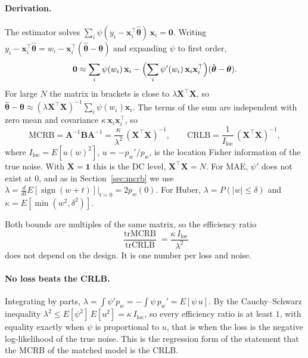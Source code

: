 \documentclass[11pt]{article}
\numberwithin{figure}{section}
\numberwithin{equation}{section}
\begin{document}
\paragraph{Derivation.} The estimator solves $\sum_i \psi(y_i - \mathbf{x}_i^\top\hat{\boldsymbol\theta})\,\mathbf{x}_i = \mathbf 0$.
Writing $y_i - \mathbf{x}_i^\top\hat{\boldsymbol\theta} = w_i - \mathbf{x}_i^\top(\hat{\boldsymbol\theta} - \boldsymbol\theta)$ and expanding
$\psi$ to first order,
\[
  \mathbf 0 \approx \sum_i \psi(w_i)\,\mathbf{x}_i - \Bigl(\sum_i \psi'(w_i)\,\mathbf{x}_i\mathbf{x}_i^\top\Bigr)(\hat{\boldsymbol\theta} - \boldsymbol\theta).
\]
For large $N$ the matrix in brackets is close to $\lambda\mathbf{X}^\top\mathbf{X}$, so
$\hat{\boldsymbol\theta} - \boldsymbol\theta \approx (\lambda\mathbf{X}^\top\mathbf{X})^{-1}\sum_i\psi(w_i)\mathbf{x}_i$. The terms of the sum are
independent with zero mean and covariance $\kappa\,\mathbf{x}_i\mathbf{x}_i^\top$, so
\begin{equation}
  \text{MCRB} = \mathbf{A}^{-1}\mathbf{B}\mathbf{A}^{-1} = \frac{\kappa}{\lambda^2}\,(\mathbf{X}^\top\mathbf{X})^{-1},
  \qquad
  \text{CRLB} = \frac{1}{I_{\text{loc}}}\,(\mathbf{X}^\top\mathbf{X})^{-1},
  \label{eq:mcrb-reg}
\end{equation}
where $I_{\text{loc}} = E[u(w)^2]$, $u = -p_w'/p_w$, is the location Fisher information of the true noise. With
$\mathbf{X} = \mathbf 1$ this is the DC level, $\mathbf{X}^\top\mathbf{X} = N$. For MAE, $\psi'$ does not exist at $0$, and as in
Section~\ref{sec:mcrb} we use $\lambda = \frac{d}{dt}E[\operatorname{sign}(w + t)]|_{t=0} = 2p_w(0)$. For Huber,
$\lambda = P(|w| \leq \delta)$ and $\kappa = E[\min(w^2, \delta^2)]$.

Both bounds are multiples of the same matrix, so the efficiency ratio
\[
  \frac{\operatorname{tr}\text{MCRB}}{\operatorname{tr}\text{CRLB}} = \frac{\kappa\,I_{\text{loc}}}{\lambda^2}
\]
does not depend on the design. It is one number per loss and noise.

\paragraph{No loss beats the CRLB.} Integrating by parts, $\lambda = \int\psi' p_w = -\int \psi\,p_w' = E[\psi\,u]$.
By the Cauchy--Schwarz inequality $\lambda^2 \leq E[\psi^2]\,E[u^2] = \kappa\,I_{\text{loc}}$, so every efficiency
ratio is at least $1$, with equality exactly when $\psi$ is proportional to $u$, that is when the loss is the
negative log-likelihood of the true noise. This is the regression form of the statement that the MCRB
of the matched model is the CRLB.
\end{document}

